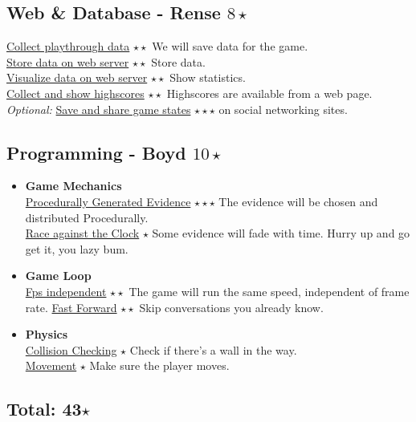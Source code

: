 \documentclass{article}
\begin{document}
		\subsection{Web \& Database - Rense $8 \star$}
			\underline{Collect playthrough data} $\star \star$ We will save data for the game. \\
			\underline{Store data on web server} $\star \star$ Store data. \\
			\underline{Visualize data on web server} $\star \star$ Show statistics. \\
			\underline{Collect and show highscores} $\star \star$ Highscores are available from a web page. \\
			\textit{Optional:} \underline{Save and share game states} $\star \star \star$ on social networking sites.
		\subsection{Programming - Boyd $10 \star$}
			\begin{itemize}
				\item \textbf{Game Mechanics}\\
					\underline{Procedurally Generated Evidence} $\star \star \star$ The evidence will be chosen and distributed Procedurally.\\
					\underline{Race against the Clock} $\star$ Some evidence will fade with time. Hurry up and go get it, you lazy bum.
				\item \textbf{Game Loop}\\
					\underline{Fps independent} $\star \star$ The game will run the same speed, independent of frame rate.
					\underline{Fast Forward} $\star \star$ Skip conversations you already know.
				\item \textbf{Physics}\\
					\underline{Collision Checking} $\star$ Check if there's a wall in the way.\\
					\underline{Movement} $\star$ Make sure the player moves.
			\end{itemize}

			\subsection*{Total: 43$\star$}

			
\end{document}
